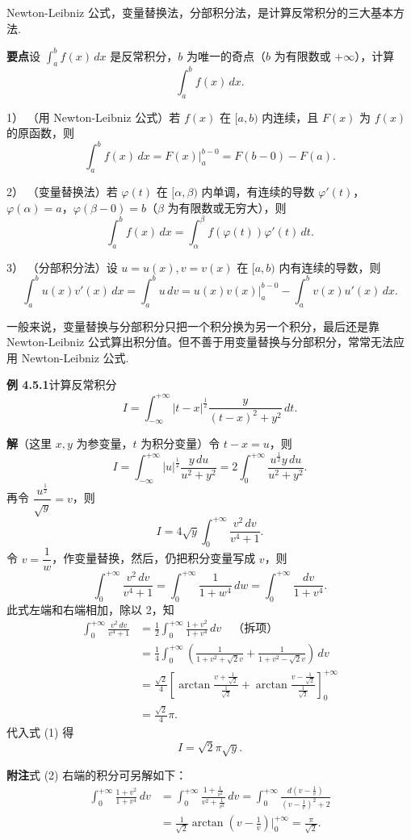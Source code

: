 \documentclass[UTF8, 12pt, fontset=fandol, oneside]{ctexart}
\begin{document}
Newton-Leibniz 公式，变量替换法，分部积分法，是计算反常积分的三大基本方法.

\noindent\textbf{要点}\quad 设 $\displaystyle\int_a^b f(x)\,dx$ 是反常积分，$b$ 为唯一的奇点（$b$ 为有限数或 $+\infty$），计算
\[
\int_a^b f(x)\,dx.
\]

1） （用 Newton-Leibniz 公式）若 $f(x)$ 在 $[a,b)$ 内连续，且 $F(x)$ 为 $f(x)$ 的原函数，则
\[
\int_a^b f(x)\,dx
=F(x)\Big|_a^{b-0}=F(b-0)-F(a).
\]

2） （变量替换法）若 $\varphi(t)$ 在 $[\alpha,\beta)$ 内单调，有连续的导数 $\varphi'(t)$，$\varphi(\alpha)=a$，$\varphi(\beta-0)=b$（$\beta$ 为有限数或无穷大），则
\[
\int_a^b f(x)\,dx
=\int_\alpha^\beta f(\varphi(t))\varphi'(t)\,dt.
\]

3） （分部积分法）设 $u=u(x),v=v(x)$ 在 $[a,b)$ 内有连续的导数，则
\[
\int_a^b u(x)v'(x)\,dx
=\int_a^b u\,dv
=u(x)v(x)\Big|_a^{b-0}-\int_a^b v(x)u'(x)\,dx.
\]

一般来说，变量替换与分部积分只把一个积分换为另一个积分，最后还是靠 Newton-Leibniz 公式算出积分值。但不善于用变量替换与分部积分，常常无法应用 Newton-Leibniz 公式.

\noindent\textbf{例 4.5.1}\quad 计算反常积分
\[
I=\int_{-\infty}^{+\infty}|t-x|^{\frac12}
\frac{y}{(t-x)^2+y^2}\,dt.
\]

\noindent\textbf{解}\quad （这里 $x,y$ 为参变量，$t$ 为积分变量）令 $t-x=u$，则
\[
I=\int_{-\infty}^{+\infty}|u|^{\frac12}\frac{y\,du}{u^2+y^2}
=2\int_0^{+\infty}\frac{u^{\frac12}y\,du}{u^2+y^2}.
\]
再令 $\dfrac{u^{\frac12}}{\sqrt y}=v$，则
\[
I=4\sqrt y\int_0^{+\infty}\frac{v^2\,dv}{v^4+1}. \tag{1}
\]
令 $v=\dfrac1w$，作变量替换，然后，仍把积分变量写成 $v$，则
\[
\int_0^{+\infty}\frac{v^2\,dv}{v^4+1}
=\int_0^{+\infty}\frac1{1+w^4}\,dw
=\int_0^{+\infty}\frac{dv}{1+v^4}.
\]
此式左端和右端相加，除以 2，知
\[
\begin{aligned}
\int_0^{+\infty}\frac{v^2\,dv}{v^4+1}
&=\frac12\int_0^{+\infty}\frac{1+v^2}{1+v^4}\,dv \quad\text{（拆项）}\\
&=\frac14\int_0^{+\infty}
\left(\frac1{1+v^2+\sqrt2v}+\frac1{1+v^2-\sqrt2v}\right)\,dv\\
&=\frac{\sqrt2}{4}\left[
\arctan\frac{v+\frac1{\sqrt2}}{\frac1{\sqrt2}}
+\arctan\frac{v-\frac1{\sqrt2}}{\frac1{\sqrt2}}
\right]_0^{+\infty}\\
&=\frac{\sqrt2}{4}\pi.
\end{aligned}
\]
代入式 (1) 得
\[
I=\sqrt2\pi\sqrt y.
\]

\noindent\textbf{附注}\quad 式 (2) 右端的积分可另解如下：
\[
\begin{aligned}
\int_0^{+\infty}\frac{1+v^2}{1+v^4}\,dv
&=\int_0^{+\infty}\frac{1+\frac1{v^2}}{v^2+\frac1{v^2}}\,dv
=\int_0^{+\infty}\frac{d\left(v-\frac1v\right)}
{\left(v-\frac1v\right)^2+2}\\
&=\frac1{\sqrt2}\arctan\left(v-\frac1v\right)\Big|_0^{+\infty}
=\frac{\pi}{\sqrt2}.
\end{aligned}
\]
\end{document}

